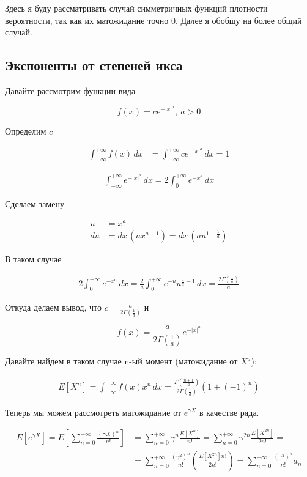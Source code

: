 \documentclass[12pt, a4paper]{article}
\theoremstyle{remark}
\newcommand{\expx}[1]{e^{-|x|^{#1}}}
\newcommand{\expxpoz}[1]{e^{-x^{#1}}}
\newcommand{\infint}[1]{\int_{-\infty}^{+\infty} #1 \, dx}
\newcommand{\infintpoz}[1]{\int_{0}^{+\infty} #1 \, dx}
\begin{document}
Здесь я буду рассматривать случай симметричных функций плотности вероятности, так как их матожидание точно 0. Далее я обобщу на более общий случай.

\subsection*{Экспоненты от степеней икса}

Давайте рассмотрим функции вида

$$f(x) = c \expx{a},\ a > 0$$

Определим $c$

\begin{align*}
    \infint{f(x)} &= \infint{c\expx{a}} = 1
\end{align*}

\begin{align*}
    \infint{\expx{a}} = 2\infintpoz{\expxpoz{a}}
\end{align*}

Сделаем замену

\begin{align*}
    u &= x^a \\
    du &= dx\,(a x^{a - 1}) = dx\,(a u^{1 - \frac{1}{a}})
\end{align*}

В таком случае

\begin{align*}
    2\infintpoz{\expxpoz{a}} = \frac{2}{a} \infintpoz{e^{-u}u^{\frac{1}{a} - 1}} = \frac{2\Gamma(\frac{1}{a})}{a}
\end{align*}

Откуда делаем вывод, что $c = \frac{a}{2\Gamma(\frac{1}{a})}
$ и 

$$f(x) = \frac{a}{2\Gamma(\frac{1}{a})} \expx{a}$$

Давайте найдем в таком случае n-ый момент (матожидание от $X^a$): 

\begin{align*}
    E[X^n] = \infint{f(x) x^n} = \frac{\Gamma(\frac{n + 1}{a})}{2\Gamma(\frac{1}{a})} (1 + (-1)^n)
\end{align*}

Теперь мы можем рассмотреть матожидание от $e^{\gamma X}$ в качестве ряда.

\begin{align*}
    E[e^{\gamma X}] = E\left[\sum_{n = 0}^{+\infty}\frac{(\gamma X)^n}{n!}\right] &= \sum_{n = 0}^{+\infty}\gamma^n\frac{E[X^n]}{n!} = \sum_{n = 0}^{+\infty}\gamma^{2n}\frac{E[X^{2n}]}{2n!} =\\
    &= \sum_{n = 0}^{+\infty}\frac{(\gamma^2)^{n}}{n!}\left(\frac{E[X^{2n}]n!}{2n!}\right) = \sum_{n = 0}^{+\infty}\frac{(\gamma^2)^{n}}{n!} a_n
\end{align*}
\end{document}
